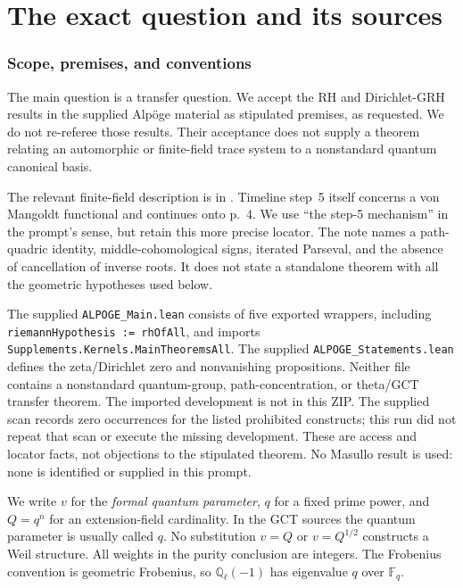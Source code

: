 \documentclass[11pt,a4paper]{article}
\newcommand{\Q}{\mathbb Q}\newcommand{\Z}{\mathbb Z}\newcommand{\C}{\mathbb C}\newcommand{\N}{\mathbb N}\newcommand{\F}{\mathbb F}
\theoremstyle{named}\newtheorem{finding}{Finding}[section]
\theoremstyle{definition}\newtheorem{definition}[finding]{Definition}
\theoremstyle{remark}\newtheorem{remark}[finding]{Remark}
\begin{document}
\part{The exact question and its sources}
\section{Scope, premises, and conventions}\label{sec:scope}
The main question is a transfer question. We accept the RH and Dirichlet-GRH results in the supplied Alp\"oge material as stipulated premises, as requested. We do not re-referee those results. Their acceptance does not supply a theorem relating an automorphic or finite-field trace system to a nonstandard quantum canonical basis.

The relevant finite-field description is in \cite[printed p.~3, footnote~3, attached to the paragraph before the timeline; also step~3]{Alpoge}. Timeline step~5 itself concerns a von Mangoldt functional and continues onto p.~4. We use ``the step-5 mechanism'' in the prompt's sense, but retain this more precise locator. The note names a path-quadric identity, middle-cohomological signs, iterated Parseval, and the absence of cancellation of inverse roots. It does not state a standalone theorem with all the geometric hypotheses used below.

The supplied \texttt{ALPOGE\_Main.lean} consists of five exported wrappers, including \texttt{riemannHypothesis := rhOfAll}, and imports \texttt{Supplements.Kernels.MainTheoremsAll}. The supplied \texttt{ALPOGE\_Statements.lean} defines the zeta/Dirichlet zero and nonvanishing propositions. Neither file contains a nonstandard quantum-group, path-concentration, or theta/GCT transfer theorem. The imported development is not in this ZIP. The supplied scan records zero occurrences for the listed prohibited constructs; this run did not repeat that scan or execute the missing development. These are access and locator facts, not objections to the stipulated theorem. No Masullo result is used: none is identified or supplied in this prompt.

We write $v$ for the \emph{formal quantum parameter}, $q$ for a fixed prime power, and $Q=q^n$ for an extension-field cardinality. In the GCT sources the quantum parameter is usually called $q$. No substitution $v=Q$ or $v=Q^{1/2}$ constructs a Weil structure. All weights in the purity conclusion are integers. The Frobenius convention is geometric Frobenius, so $\Q_\ell(-1)$ has eigenvalue $q$ over $\F_q$.
\end{document}
